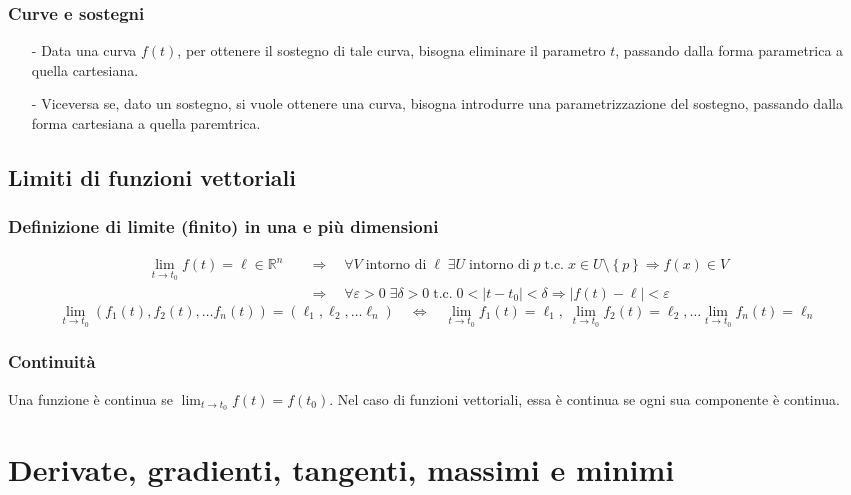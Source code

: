 \documentclass[a4paper]{article}
\newcommand\Rn{\mathbb{R}^n}  %
\newcommand\tc{\text{t.c.}}   %
\begin{document}
\subsubsection*{Curve e sostegni}
\begin{itemize}[topsep=3pt, itemsep=0pt]
	\item[-] Data una curva \(f(t)\), per ottenere il sostegno di tale curva, bisogna eliminare il parametro \(t\), passando dalla
	forma parametrica a quella cartesiana.
	\item[-] Viceversa se, dato un sostegno, si vuole ottenere una curva, bisogna introdurre una parametrizzazione del sostegno,
	passando dalla forma cartesiana a quella paremtrica.
\end{itemize}

\subsection{Limiti di funzioni vettoriali}
\subsubsection*{Definizione di limite (finito) in una e più dimensioni}
\begin{align*}
	\lim_{t \to t_0} f(t) = \ell \in \Rn \quad &\Rightarrow \quad \forall V \; \text{intorno di} \; \ell \; \exists U \; \text{intorno di} \; p \; \tc \; x \in U \setminus \left\{p\right\} \Rightarrow f(x) \in V \\
	&\Rightarrow \quad \forall \varepsilon > 0 \; \exists \delta > 0 \; \tc \; 0 < \left|t-t_0\right| < \delta \Rightarrow \left|f(t) - \ell\right| < \varepsilon
\end{align*}
\[\lim_{t \to t_0} (f_1(t), f_2(t), \dots f_n(t)) = (\ell_1, \ell_2, \dots \ell_n) \quad \Leftrightarrow \quad \lim_{t \to t_0} f_1(t) = \ell_1, \; \lim_{t \to t_0} f_2(t) = \ell_2, \dots \lim_{t \to t_0} f_n(t) = \ell_n\]

\subsubsection*{Continuità}
Una funzione è continua se \(\lim_{t \to t_0} f(t) = f(t_0)\). Nel caso di funzioni vettoriali, essa è continua se ogni sua componente
è continua.

\newpage


\section{Derivate, gradienti, tangenti, massimi e minimi}
\end{document}
